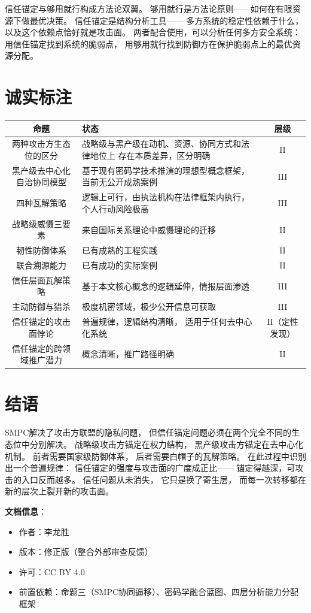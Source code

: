 \documentclass[11pt,a4paper]{article}
\begin{document}
信任锚定与够用就行构成方法论双翼。
够用就行是方法论原则——如何在有限资源下做最优决策。
信任锚定是结构分析工具——
多方系统的稳定性依赖于什么，
以及这个依赖点恰好就是攻击面。
两者配合使用，可以分析任何多方安全系统：
用信任锚定找到系统的脆弱点，
用够用就行找到防御方在保护脆弱点上的最优资源分配。

\section{诚实标注}

\begin{center}
\begin{xltabular}{\textwidth}{c|X|c}
\toprule
\textbf{命题} & \textbf{状态} & \textbf{层级} \\
\midrule
两种攻击方生态位的区分 &
战略级与黑产级在动机、资源、协同方式和法律地位上
存在本质差异，区分明确 &
II \\
黑产级去中心化自治协同模型 &
基于现有密码学技术推演的理想型概念框架，
当前无公开成熟案例 &
III \\
四种瓦解策略 &
逻辑上可行，由执法机构在法律框架内执行，
个人行动风险极高 &
III \\
战略级威慑三要素 &
来自国际关系理论中威慑理论的迁移 &
II \\
韧性防御体系 &
已有成熟的工程实践 &
II \\
联合溯源能力 &
已有成功的实际案例 &
II \\
信任层面瓦解策略 &
基于本文核心概念的逻辑延伸，情报层面渗透 &
III \\
主动防御与猎杀 &
极度机密领域，极少公开信息可获取 &
III \\
信任锚定的攻击面悖论 &
普遍规律，逻辑结构清晰，
适用于任何去中心化系统 &
II（定性发现） \\
信任锚定的跨领域推广潜力 &
概念清晰，推广路径明确 &
II \\
\bottomrule
\end{xltabular}
\end{center}

\section{结语}

SMPC解决了攻击方联盟的隐私问题，
但信任锚定问题必须在两个完全不同的生态位中分别解决。
战略级攻击方锚定在权力结构，
黑产级攻击方锚定在去中心化机制。
前者需要国家级防御体系，
后者需要白帽子的瓦解策略。
在此过程中识别出一个普遍规律：
信任锚定的强度与攻击面的广度成正比——
锚定得越深，可攻击的入口反而越多。
信任问题从未消失，
它只是换了寄生层，
而每一次转移都在新的层次上裂开新的攻击面。

\vspace{5mm}
\noindent\textbf{文档信息}：
\begin{itemize}
    \item 作者：李龙胜
    \item 版本：修正版（整合外部审查反馈）
    \item 许可：CC BY 4.0
    \item 前置依赖：命题三（SMPC协同逼移）、密码学融合蓝图、四层分析能力分配框架
\end{itemize}
\end{document}

